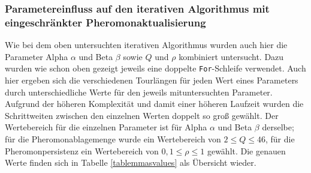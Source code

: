 \documentclass[doktyp=barbeit, sprache=german]{TUBAFarbeiten}
\begin{document}
\subsubsection{Parametereinfluss auf den iterativen Algorithmus mit eingeschränkter Pheromonaktualisierung}
Wie bei dem oben untersuchten iterativen Algorithmus wurden auch hier die Parameter Alpha $\alpha$ und Beta $\beta$ sowie $Q$ und $\rho$ kombiniert untersucht. Dazu wurden wie schon oben gezeigt jeweils eine doppelte \texttt{For}-Schleife verwendet. Auch hier ergeben sich die verschiedenen Tourlängen für jeden Wert eines Parameters durch unterschiedliche Werte für den jeweils mituntersuchten Parameter. Aufgrund der höheren Komplexität und damit einer höheren Laufzeit wurden die Schrittweiten zwischen den einzelnen Werten doppelt so groß gewählt. Der Wertebereich für die einzelnen Parameter ist für Alpha $\alpha$ und Beta $\beta$ derselbe; für die Pheromonablagemenge wurde ein Wertebereich von $2 \leq Q \leq 46$, für die Pheromonpersistenz ein Wertebereich von $0,1 \leq \rho \leq 1$ gewählt. Die genauen Werte finden sich in Tabelle \ref{tablemmasvalues} als Übersicht wieder.
\begin{table}[]
\centering
{}
\caption[Übersicht über die Parameterwerte für die Untersuchung der Abhängigkeit der einzelnen Parameter bei Betrachtung des iterativen Algorithmus mit eingeschränkter Pheromonaktualisierung zur Tourkonstruktion]{Übersicht über die Parameterwerte für die Untersuchung der Abhängigkeit der einzelnen Parameter bei Betrachtung des iterativen Algorithmus mit eingeschränkter Pheromonaktualisierung zur Tourkonstruktion. Die Spalte \glqq Parameterwert bei Untersuchung der anderen Algorithmen\grqq\, gibt an, welche Wert für Alpha $\alpha$ und Beta $\beta$ bei Untersuchung der Pheromonablagemenge und der Pheromonpersistenz gewählt wurde und umgekehrt.}
\label{tablemmasvalues}
\end{table}
\end{document}
